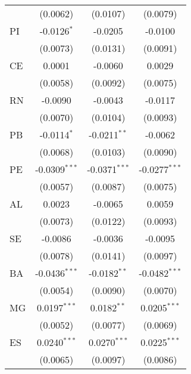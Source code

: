\begin{tabular}{lccc}
                   & (0.0062)                & (0.0107)                & (0.0079)\\   
   PI              & -0.0126$^{*}$           & -0.0205                 & -0.0100\\   
                   & (0.0073)                & (0.0131)                & (0.0091)\\   
   CE              & 0.0001                  & -0.0060                 & 0.0029\\   
                   & (0.0058)                & (0.0092)                & (0.0075)\\   
   RN              & -0.0090                 & -0.0043                 & -0.0117\\   
                   & (0.0070)                & (0.0104)                & (0.0093)\\   
   PB              & -0.0114$^{*}$           & -0.0211$^{**}$          & -0.0062\\   
                   & (0.0068)                & (0.0103)                & (0.0090)\\   
   PE              & -0.0309$^{***}$         & -0.0371$^{***}$         & -0.0277$^{***}$\\   
                   & (0.0057)                & (0.0087)                & (0.0075)\\   
   AL              & 0.0023                  & -0.0065                 & 0.0059\\   
                   & (0.0073)                & (0.0122)                & (0.0093)\\   
   SE              & -0.0086                 & -0.0036                 & -0.0095\\   
                   & (0.0078)                & (0.0141)                & (0.0097)\\   
   BA              & -0.0436$^{***}$         & -0.0182$^{**}$          & -0.0482$^{***}$\\   
                   & (0.0054)                & (0.0090)                & (0.0070)\\   
   MG              & 0.0197$^{***}$          & 0.0182$^{**}$           & 0.0205$^{***}$\\   
                   & (0.0052)                & (0.0077)                & (0.0069)\\   
   ES              & 0.0240$^{***}$          & 0.0270$^{***}$          & 0.0225$^{***}$\\   
                   & (0.0065)                & (0.0097)                & (0.0086)\\   

\end{tabular}
